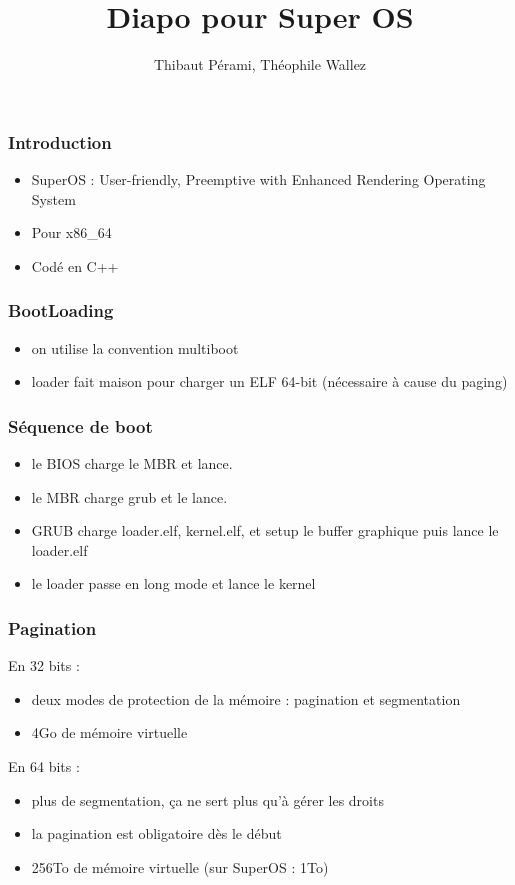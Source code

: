 \documentclass[aspectration=43]{beamer}
\title{Diapo pour Super OS}
\author{Thibaut Pérami, Théophile Wallez}
\begin{document}
\frame{\titlepage}

\begin{frame}
    \frametitle{Introduction}
    \begin{itemize}
        \item SuperOS : User-friendly, Preemptive with Enhanced Rendering Operating System
        \item Pour x86\_64
        \item Codé en C++
    \end{itemize}
\end{frame}

\begin{frame}
    \frametitle{BootLoading}
    \begin{itemize}
        \item on utilise la convention multiboot
        \item loader fait maison pour charger un ELF 64-bit (nécessaire à cause du paging)
    \end{itemize}
\end{frame}

\begin{frame}
  \frametitle{Séquence de boot}
  \begin{itemize}
  \item le BIOS charge le MBR et lance.
  \item le MBR charge grub et le lance.
  \item GRUB charge loader.elf, kernel.elf, et setup le buffer graphique puis
    lance le loader.elf
  \item le loader passe en long mode et lance le kernel
  \end{itemize}
\end{frame}


\begin{frame}
    \frametitle{Pagination}
    En 32 bits :
    \begin{itemize}
        \item deux modes de protection de la mémoire : pagination et segmentation
        \item 4Go de mémoire virtuelle
    \end{itemize}
    En 64 bits :
    \begin{itemize}
        \item plus de segmentation, ça ne sert plus qu'à gérer les droits
        \item la pagination est obligatoire dès le début
        \item 256To de mémoire virtuelle (sur SuperOS : 1To)
    \end{itemize}
\end{frame}
\end{document}
